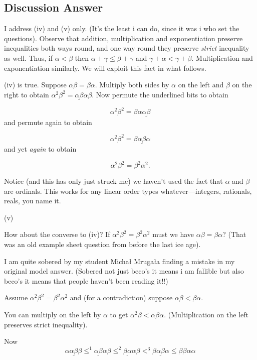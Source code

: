 \documentclass{book}
\begin{document}
\subsection*{Discussion Answer}

I address (iv) and (v) only.  (It's the least i can do, since it was
i who set the questions).  Observe that addition, multiplication and
exponentiation preserve inequalities both ways round, and one way
round they preserve {\sl strict} inequality as well.  Thus, if
$\alpha < \beta$ then $\alpha + \gamma \leq \beta+ \gamma$ and
$\gamma + \alpha < \gamma + \beta$.  Multiplication and exponentiation
similarly. We will exploit this fact in what follows.

\smallskip

(iv) is true. Suppose $\alpha\beta = \beta\alpha$.  Multiply both
sides by $\alpha$ on the left and $\beta$ on the right to obtain
$\alpha^2\beta^2 = \underline{\alpha\beta}\alpha\beta$.  Now permute
the underlined bits to obtain

$$\alpha^2\beta^2 = \beta\alpha\underline{\alpha\beta}$$  and permute again to obtain

$$\alpha^2\beta^2 = \beta\underline{\alpha\beta}\alpha$$ and yet  {\sl again} to obtain

$$\alpha^2\beta^2 = \beta^2\alpha^2.$$

Notice (and this has only just struck me) we haven't used the fact
that $\alpha$ and $\beta$ are ordinals.  This works for any linear
order types whatever---integers, rationals, reals, you name it.

\smallskip

(v)

How about the converse to (iv)?  If $\alpha^2\beta^2 = \beta^2\alpha^2$
must we have $\alpha\beta = \beta\alpha$?  (That was an old example
sheet question from before the last ice age).
\smallskip

I am quite sobered by my student Micha\l{} Mruga\l{}a finding a mistake in my original model answer.
(Sobered not just beco's it means i am fallible but also beco's it means that people haven't been reading it!!)


Assume $\alpha^2\beta^2 = \beta^2\alpha^2$ and (for a contradiction) suppose $\alpha\beta < \beta\alpha$.

You can multiply on the left by $\alpha$ to get $\alpha^2\beta < \alpha\beta\alpha$.  (Multiplication on the left preserves strict inequality).

Now
$$\alpha\underline{\alpha\beta}\beta \leq^{1} \underline{\alpha\beta}\alpha\beta \leq^{2} \underline{\beta\alpha}\alpha\beta <^{3} \beta\underline{\alpha\beta}\alpha \leq \beta\beta\alpha\alpha$$
\end{document}
